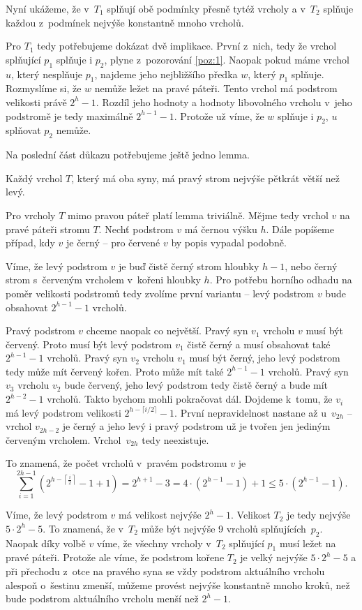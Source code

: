 \begin{dukaz}
Nyní ukážeme, že v~$T_1$ splňují obě podmínky přesně tytéž vrcholy a v~$T_2$ splňuje každou z~podmínek nejvýše konstantně mnoho vrcholů.

Pro $T_1$ tedy potřebujeme dokázat dvě implikace. První z~nich, tedy že vrchol
splňující $p_1$ splňuje i $p_2$, plyne z~pozorování \ref{poz:1}. Naopak pokud
máme vrchol $u$, který nesplňuje $p_1$, najdeme jeho nejbližšího předka $w$,
který $p_1$ splňuje. Rozmyslíme si, že $w$ nemůže ležet na pravé páteři. Tento vrchol má podstrom velikosti právě $2^{h}-1$. Rozdíl
jeho hodnoty a hodnoty libovolného vrcholu v~jeho podstromě je tedy maximálně
$2^{h-1}-1$. Protože už víme, že $w$ splňuje i $p_2$, $u$ splňovat $p_2$
nemůže.

Na poslední část důkazu potřebujeme ještě jedno lemma.

\begin{lemma}
Každý vrchol $T$, který má oba syny, má pravý strom nejvýše pětkrát větší než levý.
\end{lemma}
\begin{dukaz}
Pro vrcholy $T$ mimo pravou páteř platí lemma triviálně. Mějme tedy vrchol $v$ na pravé páteři stromu $T$. Nechť podstrom $v$ má černou výšku $h$. Dále popíšeme případ, kdy $v$ je černý -- pro červené $v$ by popis vypadal podobně. 

Víme, že levý podstrom $v$ je buď čistě černý strom hloubky $h-1$, nebo černý strom s~červeným vrcholem v~kořeni hloubky $h$. Pro potřebu horního odhadu na poměr velikosti podstromů tedy zvolíme první variantu -- levý podstrom $v$ bude obsahovat $2^{h-1} -1$ vrcholů. 

Pravý podstrom $v$ chceme naopak co největší. Pravý syn $v_1$ vrcholu $v$ 
musí být červený. Proto musí být levý podstrom $v_1$ čistě černý a musí
obsahovat také $2^{h-1} -1$ vrcholů. Pravý syn $v_2$ vrcholu $v_1$ musí být
černý, jeho levý podstrom tedy může mít červený kořen. Proto může mít také
$2^{h-1} -1$ vrcholů. Pravý syn $v_3$ vrcholu $v_2$ bude červený, jeho levý
podstrom tedy čistě černý a bude mít $2^{h-2}-1$ vrcholů. Takto bychom
mohli pokračovat dál. Dojdeme k~tomu, že $v_i$ má levý podstrom velikosti
$2^{h-\lceil i/2\rceil} -1$. První nepravidelnost nastane až u~$v_{2h}$ --
vrchol $v_{2h-2}$ je černý a jeho levý i pravý podstrom už je tvořen jen
jediným červeným vrcholem. Vrchol~$v_{2h}$ tedy neexistuje.

To znamená, že počet vrcholů v~pravém podstromu $v$ je $$\sum_{i=1}^{2h-1}\left(2^{h-\left\lceil \frac i2\right\rceil} -1 +1\right) = 2^{h+1}-3 = 4\cdot (2^{h-1}-1) +1 \leq 5\cdot(2^{h-1}-1).$$
\end{dukaz}

Víme, že levý podstrom $v$ má velikost nejvýše $2^h-1$. Velikost $T_2$ je tedy nejvýše $5\cdot 2^h - 5$. To znamená, že v~$T_2$ může být nejvýše 9 vrcholů splňujících~$p_2$. Naopak díky volbě $v$ víme, že všechny vrcholy v~$T_2$ splňující $p_1$ musí ležet na pravé páteři. Protože ale víme, že podstrom kořene $T_2$ je velký nejvýše $5\cdot 2^h-5$ a při přechodu z~otce na pravého syna se vždy podstrom aktuálního vrcholu alespoň o~šestinu zmenší, můžeme provést nejvýše konstantně mnoho kroků, než bude podstrom aktuálního vrcholu menší než $2^h-1$. 
\end{dukaz}

